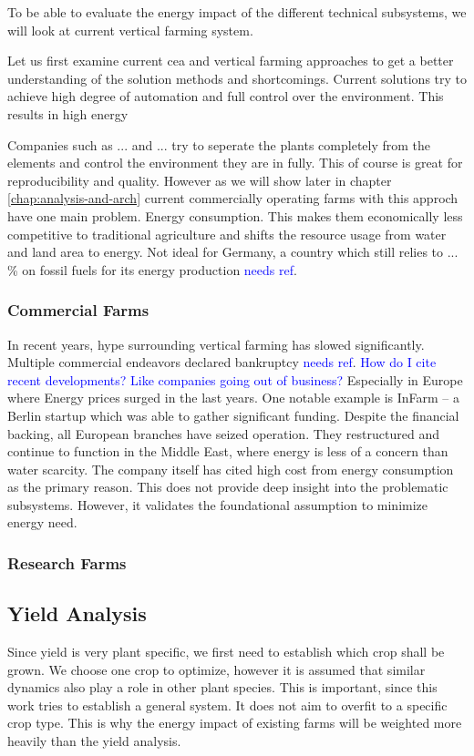 To be able to evaluate the energy impact of the different technical subsystems, we will look at current vertical farming system.

Let us first examine current \ac{cea} and vertical farming approaches to get a better understanding of the solution methods and shortcomings.
Current solutions try to achieve high degree of automation and full control over the environment.
This results in high energy

Companies such as ... and ... try to seperate the plants completely from the elements and control the environment they are in fully.
This of course is great for reproducibility and quality.
However as we will show later in chapter \ref{chap:analysis-and-arch} current commercially operating farms with this approch have one main problem.
Energy consumption.
This makes them economically less competitive to traditional agriculture and shifts the resource usage from water and land area to energy.
Not ideal for Germany, a country which still relies to ... \% on fossil fuels for its energy production \textcolor{blue}{needs ref}.

\subsubsection{Commercial Farms}
In recent years, hype surrounding vertical farming has slowed significantly.
Multiple commercial endeavors declared bankruptcy \textcolor{Blue}{needs ref}.
\textcolor{Blue}{How do I cite recent developments? Like companies going out of business?}
Especially in Europe where Energy prices surged in the last years.
One notable example is InFarm -- a Berlin startup which was able to gather significant funding.
Despite the financial backing, all European branches have seized operation.
They restructured and continue to function in the Middle East, where energy is less of a concern than water scarcity.
The company itself has cited high cost from energy consumption as the primary reason.
This does not provide deep insight into the problematic subsystems.
However, it validates the foundational assumption to minimize energy need.

\subsubsection{Research Farms}



\subsection{Yield Analysis}
\label{sub:yield-analysis}
Since yield is very plant specific, we first need to establish which crop shall be grown.
We choose one crop to optimize, however it is assumed that similar dynamics also play a role in other plant species.
This is important, since this work tries to establish a general system.
It does not aim to overfit to a specific crop type.
This is why the energy impact of existing farms will be weighted more heavily than the yield analysis.

